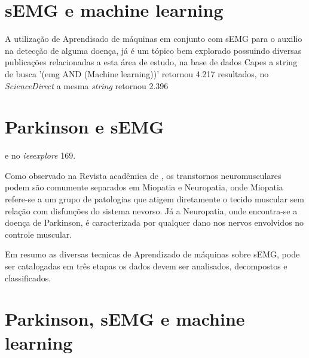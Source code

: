 \section{sEMG e machine learning}
A utilização de Aprendisado de máquinas em conjunto com sEMG para o auxilio na detecção de alguma doença, já é um tópico bem explorado possuindo diversas publicações relacionadas a esta área de estudo, na base de dados Capes a string de busca '(emg AND (Machine learning))' retornou 4.217 resultados, no \textit{ScienceDirect} a mesma \textit{string} retornou 2.396 \section{Parkinson e sEMG} e no \textit{ieeexplore} 169.

Como observado na Revista acadêmica de \cite{yousefi2014characterizing}, os transtornos neuromusculares podem são comumente separados em Miopatia e Neuropatia, onde Miopatia refere-se a um grupo de patologias que atigem diretamente o tecido muscular sem relação com disfunções do sistema nevorso. Já a Neuropatia, onde encontra-se a doença de Parkinson, é caracterizada por qualquer dano nos nervos envolvidos no controle muscular.

Em resumo as diversas tecnicas de Aprendizado de máquinas sobre sEMG, pode ser catalogadas em três etapas os dados devem ser analisados, decompostos e classificados\cite{yousefi2014characterizing}.



\section{Parkinson, sEMG e machine learning}